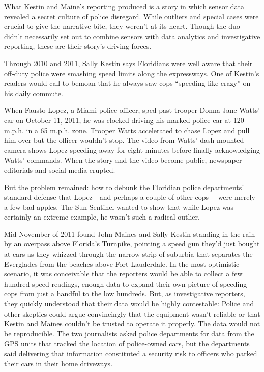 What Kestin and Maine's reporting produced is a story in which sensor data
revealed a secret culture of police disregard. While outliers and special cases
were crucial to give the narrative bite, they weren't at its heart. Though the
duo didn't necessarily set out to combine sensors with data analytics and
investigative reporting, these are their story's driving forces.

Through 2010 and 2011, Sally Kestin says Floridians were well aware that
their off-duty police were smashing speed limits along the expressways. One
of Kestin's readers would call to bemoan that he always saw cops ``speeding
like crazy'' on his daily commute.

When Fausto Lopez, a Miami police officer, sped past trooper Donna Jane
Watts' car on October 11, 2011, he was clocked driving his marked police
car at 120 m.p.h. in a 65 m.p.h. zone. Trooper Watts accelerated to chase
Lopez and pull him over but the officer wouldn't stop. The video from
Watts' dash-mounted camera shows Lopez speeding away for eight minutes
before finally acknowledging Watts' commands. When the story and
the video become public, newspaper editorials and social media erupted.

But the problem remained: how to debunk the Floridian police departments'
standard defense that Lopez—and perhaps a couple of other cops—
were merely a few bad apples. The Sun Sentinel wanted to show that while
Lopez was certainly an extreme example, he wasn't such a radical outlier.

Mid-November of 2011 found John Maines and Sally Kestin standing in the
rain by an overpass above Florida's Turnpike, pointing a speed gun they'd
just bought at cars as they whizzed through the narrow strip of suburbia
that separates the Everglades from the beaches above Fort Lauderdale. In
the most optimistic scenario, it was conceivable that the reporters would be
able to collect a few hundred speed readings, enough data to expand their
own picture of speeding cops from just a handful to the low hundreds. But,
as investigative reporters, they quickly understood that their data would be
highly contestable: Police and other skeptics could argue convincingly that
the equipment wasn't reliable or that Kestin and Maines couldn't be trusted
to operate it properly. The data would not be reproducible. The two journalists
asked police departments for data from the GPS units that tracked
the location of police-owned cars, but the departments said delivering that
information constituted a security risk to officers who parked their cars in
their home driveways.

